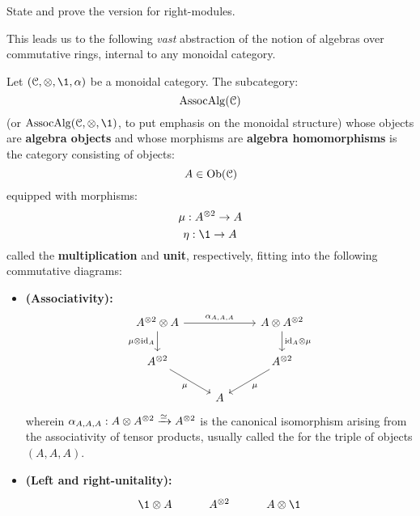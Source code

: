 \begin{question}
\begin{enumerate}
                State and prove the version for right-modules.
            \end{enumerate}
        \end{question}

        This leads us to the following \textit{vast} abstraction of the notion of algebras over commutative rings, internal to any monoidal category.
        \begin{definition} \label{def: algebras_in_monoidal_categories}
            Let $(\C, \tensor, \1, \alpha)$ be a monoidal category. The subcategory:
                $$\Assoc\Alg(\C)$$
            (or $\Assoc\Alg(\C, \tensor, \1)$, to put emphasis on the monoidal structure) whose objects are \textbf{algebra objects} and whose morphisms are \textbf{algebra homomorphisms} is the category consisting of objects:
                $$A \in \Ob(\C)$$
            equipped with morphisms:
                $$\mu: A^{\tensor 2} \to A$$
                $$\eta: \1 \to A$$
            called the \textbf{multiplication} and \textbf{unit}, respectively, fitting into the following commutative diagrams:
            \begin{itemize}
                \item \textbf{(Associativity):}
                    $$
                        \begin{tikzcd}
                        {A^{\tensor 2} \tensor A} && {A \tensor A^{\tensor 2}} \\
                        {A^{\tensor 2}} && {A^{\tensor 2}} \\
                        & A
                        \arrow["{\alpha_{A, A, A}}", from=1-1, to=1-3]
                        \arrow["{\mu \tensor \id_A}"', from=1-1, to=2-1]
                        \arrow["{\id_A \tensor \mu}", from=1-3, to=2-3]
                        \arrow["\mu"', from=2-1, to=3-2]
                        \arrow["\mu", from=2-3, to=3-2]
                        \end{tikzcd}
                    $$
                wherein $\alpha_{A, A, A}: A \tensor A^{\tensor 2} \xrightarrow[]{\cong} A^{\tensor 2}$ is the canonical isomorphism arising from the associativity of tensor products, usually called the  for the triple of objects $(A, A, A)$. 
                \item \textbf{(Left and right-unitality):}
                    $$
                        \begin{tikzcd}
                        {\1 \tensor A} & {A^{\tensor 2}} & {A \tensor \1} \\

\end{tikzcd}$$
\end{itemize}
\end{definition}
